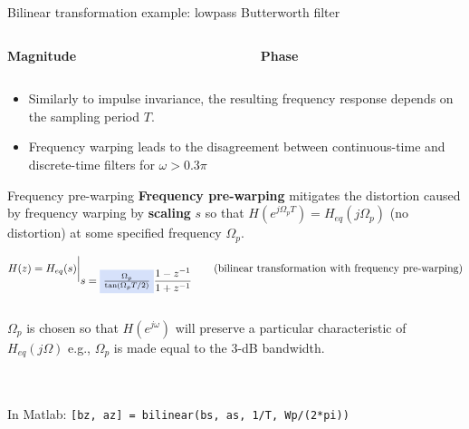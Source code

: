 \documentclass[10pt, handout]{beamer}
\begin{document}
%
\begin{frame}{Bilinear transformation example: lowpass Butterworth filter}
\begin{columns}
	\begin{column}{0.5\textwidth}
		\textbf{Magnitude}
		\begin{center}
			\resizebox{\linewidth}{!}{}
		\end{center}
	\end{column}
	\begin{column}{0.5\textwidth}
		\textbf{Phase}
		\begin{center}
			\resizebox{\linewidth}{!}{}
		\end{center}
	\end{column}
\end{columns}
\begin{itemize}
	\item Similarly to impulse invariance, the resulting frequency response depends on the sampling period $T$.
	\item Frequency warping leads to the disagreement between continuous-time and discrete-time filters for $\omega > 0.3\pi$
\end{itemize}

\end{frame}

%
\begin{frame}{Frequency pre-warping}
\textbf{Frequency pre-warping} mitigates the distortion caused by frequency warping by {\color{blue2!50} \textbf{scaling}} $s$ so that $H(e^{j\Omega_p T}) = H_{eq}(j\Omega_p)$ (no distortion) at some specified frequency $\Omega_p$.



\begin{equation*}
H(z) = H_{eq}(s)\bigg|_{\displaystyle s = \tikz[baseline]{\node[fill=blue2!20,anchor=base] {$\frac{\Omega_p}{\tan(\Omega_pT/2)}$};}\frac{1 - z^{-1}}{1 + z^{-1}}} \tag{bilinear transformation with frequency pre-warping}
\end{equation*}
~\\
$\Omega_p$ is chosen so that $H(e^{j\omega})$ will preserve a particular characteristic of $H_{eq}(j\Omega)$ e.g., $\Omega_p$ is made equal to the $3$-dB bandwidth.


~\\
~\\
In Matlab: \texttt{[bz, az] = bilinear(bs, as, 1/T, Wp/(2*pi))}
\end{frame}
\end{document}
